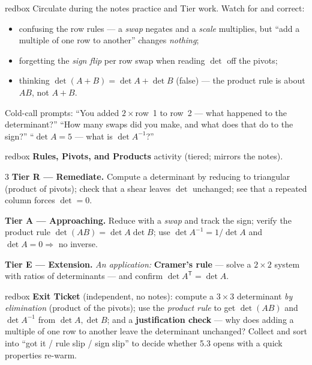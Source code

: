 \documentclass[10pt]{article}
\newcommand{\T}{\mathsf{T}}
\begin{document}
\begin{skillbox}{redbox}
Circulate during the notes practice and Tier work. Watch for and correct:
\begin{itemize}[leftmargin=1.2em, nosep]
  \item confusing the row rules --- a \emph{swap} negates and a \emph{scale} multiplies, but ``add a multiple of one row to another'' changes \emph{nothing};
  \item forgetting the \emph{sign flip} per row swap when reading $\det$ off the pivots;
  \item thinking $\det(A+B)=\det A+\det B$ (false) --- the product rule is about $AB$, not $A+B$.
\end{itemize}
Cold-call prompts: ``You added $2\times$row~1 to row~2 --- what happened to the determinant?'' ``How
many swaps did you make, and what does that do to the sign?'' ``$\det A=5$ --- what is $\det A^{-1}$?''
\end{skillbox}

\begin{skillbox}{redbox}
\textbf{Rules, Pivots, and Products} activity (tiered; mirrors the notes).
\begin{multicols}{3}
\textbf{Tier R --- Remediate.} Compute a determinant by reducing to triangular (product of pivots);
check that a shear leaves $\det$ unchanged; see that a repeated column forces $\det=0$.

\columnbreak
\textbf{Tier A --- Approaching.} Reduce with a \emph{swap} and track the sign; verify the product rule
$\det(AB)=\det A\det B$; use $\det A^{-1}=1/\det A$ and $\det A=0\Rightarrow$ no inverse.

\columnbreak
\textbf{Tier E --- Extension.} \emph{An application:} \textbf{Cramer's rule} --- solve a $2\times2$
system with ratios of determinants --- and confirm $\det A^{\T}=\det A$.
\end{multicols}
\end{skillbox}

\begin{skillbox}{redbox}
\textbf{Exit Ticket} (independent, no notes): compute a $3\times3$ determinant \emph{by elimination}
(product of the pivots); use the \emph{product rule} to get $\det(AB)$ and $\det A^{-1}$ from
$\det A,\det B$; and a \textbf{justification check} --- why does adding a multiple of one row to
another leave the determinant unchanged? Collect and sort into ``got it / rule slip / sign slip'' to
decide whether 5.3 opens with a quick properties re-warm.
\end{skillbox}
\end{document}
